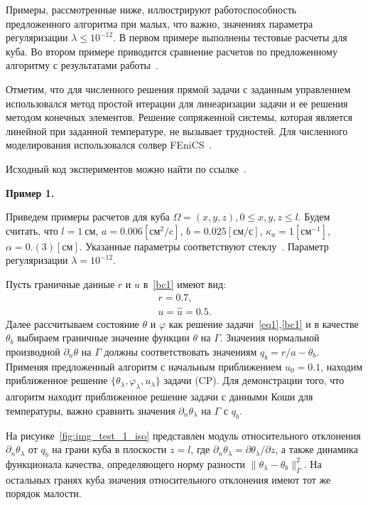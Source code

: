 Примеры, рассмотренные ниже, иллюстрируют работоспособность предложенного алгоритма при
малых, что важно, значениях параметра регуляризации $\lambda \leq 10^{-12}$.
В первом примере выполнены тестовые расчеты для куба.
Во втором примере приводится сравнение расчетов по
предложенному алгоритму с результатами работы~\cite{CNSNS19}.

Отметим, что для численного решения прямой задачи с заданным управлением использовался
метод простой итерации для линеаризации задачи и ее решения методом конечных элементов.
Решение сопряженной системы, которая является линейной при заданной температуре, не вызывает трудностей.
Для численного моделирования использовался солвер FEniCS~\cite{fenics, dolfin}.

Исходный код экспериментов можно найти по ссылке~\cite{mesenev-github}.

\textbf{Пример 1.}

Приведем примеры расчетов для куба $\Omega = {(x, y, z), 0 \leq x,y,z \leq l}$.
Будем считать, что $l=1~\text{см}$, $a = 0.006[\text{см}^2/\text{c}]$,
$b=0.025[\text{см}/\text{с}]$, $\kappa_a=1[\text{см}^{-1}]$, $\alpha = 0.(3)[\text{см}]$.
Указанные параметры соответствуют стеклу~\cite{Grenkin5}.
Параметр регуляризации $\lambda=10^{-12}.$

Пусть граничные данные $r$ и $u$ в~\eqref{bc1} имеют вид:
\begin{gather*}
    r = 0.7,\\
    u = \hat u = 0.5.
\end{gather*}
Далее рассчитываем состояние $\theta$ и $\varphi$ как решение
задачи~\eqref{eq1},\eqref{bc1} и в качестве $\theta_b$ выбираем
граничные значение функции $\theta$ на $\Gamma$.
Значения нормальной производной $\partial_n\theta$ на $\Gamma$
должны соответствовать значениям $q_b=r/a-\theta_b$.
Применяя предложенный алгоритм с начальным приближением $u_0 = 0.1$, находим приближенное решение
$\{\theta_\lambda, \varphi_\lambda, u_\lambda\}$ задачи (CP).
Для демонстрации того, что алгоритм находит приближенное решение задачи с данными
Коши для температуры, важно сравнить значения $\partial_n\theta_\lambda$ на $\Gamma$ с $q_b.$

На рисунке~\ref{fig:img_test_1_iso} представлен модуль относительного
отклонения $\partial_n\theta_\lambda$ от $q_b$ на грани куба в плоскости $z=l$,
где $\partial_n\theta_\lambda=\partial\theta_\lambda/\partial z$,
а также динамика функционала качества, определяющего норму
разности $\|\theta_\lambda -\theta_b\|^2_\Gamma$.
На остальных гранях куба значения относительного отклонения имеют тот же порядок малости.

